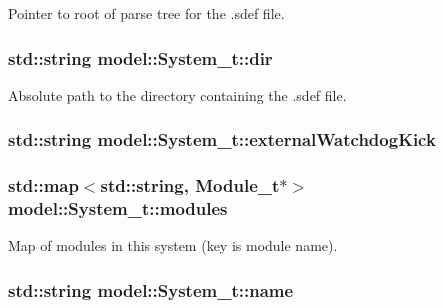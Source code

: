 Pointer to root of parse tree for the .sdef file. 

\subsubsection[{\texorpdfstring{dir}{dir}}]{\setlength{\rightskip}{0pt plus 5cm}std\+::string model\+::\+System\+\_\+t\+::dir}\hypertarget{structmodel_1_1_system__t_a6d7ea1a18181cf37ecabf08d41879171}{}\label{structmodel_1_1_system__t_a6d7ea1a18181cf37ecabf08d41879171}


Absolute path to the directory containing the .sdef file. 

\subsubsection[{\texorpdfstring{external\+Watchdog\+Kick}{externalWatchdogKick}}]{\setlength{\rightskip}{0pt plus 5cm}std\+::string model\+::\+System\+\_\+t\+::external\+Watchdog\+Kick}\hypertarget{structmodel_1_1_system__t_a9c0127f7cae79c15122941aa9058ed6b}{}\label{structmodel_1_1_system__t_a9c0127f7cae79c15122941aa9058ed6b}
\subsubsection[{\texorpdfstring{modules}{modules}}]{\setlength{\rightskip}{0pt plus 5cm}std\+::map$<$std\+::string, {\bf Module\+\_\+t}$\ast$$>$ model\+::\+System\+\_\+t\+::modules}\hypertarget{structmodel_1_1_system__t_a6bac2f3722513c86395f119438b425f6}{}\label{structmodel_1_1_system__t_a6bac2f3722513c86395f119438b425f6}


Map of modules in this system (key is module name). 

\subsubsection[{\texorpdfstring{name}{name}}]{\setlength{\rightskip}{0pt plus 5cm}std\+::string model\+::\+System\+\_\+t\+::name}\hypertarget{structmodel_1_1_system__t_a4ccbf5d2d0a8e7f647e32cfb9f184ddb}{}\label{structmodel_1_1_system__t_a4ccbf5d2d0a8e7f647e32cfb9f184ddb}


